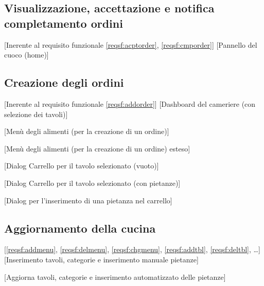 \subsection{Visualizzazione, accettazione e notifica completamento ordini}[Inerente al requisito funzionale \ref{reqsf:acptorder}, \ref{reqsf:cmporder}]
	[Pannello del cuoco (home)]

\subsection{Creazione degli ordini}[Inerente al requisito funzionale \ref{reqsf:addorder}]
	[Dashboard del cameriere (con selezione dei tavoli)]

	[Menù degli alimenti (per la creazione di un ordine)]

	[Menù degli alimenti (per la creazione di un ordine) esteso]

	[Dialog Carrello per il tavolo selezionato (vuoto)]

	[Dialog Carrello per il tavolo selezionato (con pietanze)]

	[Dialog per l'inserimento di una pietanza nel carrello]

\subsection{Aggiornamento della cucina}[\ref{reqsf:addmenu}, \ref{reqsf:delmenu}, \ref{reqsf:chgmenu}, \ref{reqsf:addtbl}, \ref{reqsf:deltbl}, \dots]
	[Inserimento tavoli, categorie e inserimento manuale pietanze]

	[Aggiorna tavoli, categorie e inserimento automatizzato delle pietanze]

